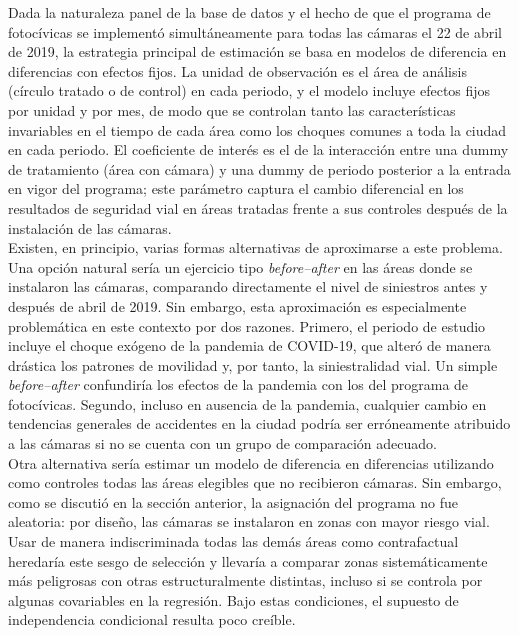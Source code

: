 Dada la naturaleza panel de la base de datos y el hecho de que el programa de fotocívicas se implementó simultáneamente para todas las cámaras el 22 de abril de 2019, la estrategia principal de estimación se basa en modelos de diferencia en diferencias con efectos fijos. La unidad de observación es el área de análisis (círculo tratado o de control) en cada periodo, y el modelo incluye efectos fijos por unidad y por mes, de modo que se controlan tanto las características invariables en el tiempo de cada área como los choques comunes a toda la ciudad en cada periodo. El coeficiente de interés es el de la interacción entre una dummy de tratamiento (área con cámara) y una dummy de periodo posterior a la entrada en vigor del programa; este parámetro captura el cambio diferencial en los resultados de seguridad vial en áreas tratadas frente a sus controles después de la instalación de las cámaras.\\

Existen, en principio, varias formas alternativas de aproximarse a este problema. Una opción natural sería un ejercicio tipo \emph{before--after} en las áreas donde se instalaron las cámaras, comparando directamente el nivel de siniestros antes y después de abril de 2019. Sin embargo, esta aproximación es especialmente problemática en este contexto por dos razones. Primero, el periodo de estudio incluye el choque exógeno de la pandemia de COVID-19, que alteró de manera drástica los patrones de movilidad y, por tanto, la siniestralidad vial. Un simple \emph{before--after} confundiría los efectos de la pandemia con los del programa de fotocívicas. Segundo, incluso en ausencia de la pandemia, cualquier cambio en tendencias generales de accidentes en la ciudad podría ser erróneamente atribuido a las cámaras si no se cuenta con un grupo de comparación adecuado.\\

Otra alternativa sería estimar un modelo de diferencia en diferencias utilizando como controles todas las áreas elegibles que no recibieron cámaras. Sin embargo, como se discutió en la sección anterior, la asignación del programa no fue aleatoria: por diseño, las cámaras se instalaron en zonas con mayor riesgo vial. Usar de manera indiscriminada todas las demás áreas como contrafactual heredaría este sesgo de selección y llevaría a comparar zonas sistemáticamente más peligrosas con otras estructuralmente distintas, incluso si se controla por algunas covariables en la regresión. Bajo estas condiciones, el supuesto de independencia condicional resulta poco creíble.\\

